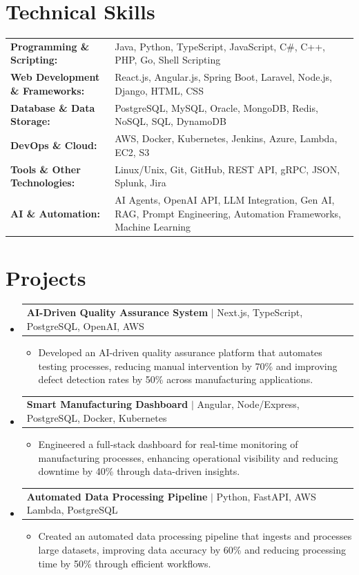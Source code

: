 \documentclass[letterpaper,10pt]{article}
\makeatletter
\newcommand{\resumeItem}[1]{
  \item{\fontsize{8pt}{9pt}\selectfont
    #1 \vspace{-3pt}
  }
}
\newcommand{\resumeProjectHeading}[2]{
    \item
    \begin{tabular*}{1.001\textwidth}{l@{\extracolsep{\fill}}r}
      \fontsize{8.5pt}{10pt}#1 & \textbf{\fontsize{8.5pt}{10pt} #2}\\
    \end{tabular*}\vspace{-7pt}
}
\newcommand{\resumeSubHeadingListStart}{\begin{itemize}[leftmargin=0pt, label={}]}
\newcommand{\resumeSubHeadingListEnd}{\end{itemize}}
\newcommand{\resumeItemListStart}{\begin{itemize}[leftmargin=*]}
\newcommand{\resumeItemListEnd}{\end{itemize}\vspace{-5pt}}
\makeatother
\begin{document}
\section{Technical Skills}
        \vspace{-14pt}
        \begin{table}[h]
            \fontsize{8pt}{9pt}\selectfont
            \begin{tabular}{p{0.3\linewidth} p{0.7\linewidth}}
                \textbf{Programming \& Scripting:} & Java, Python, TypeScript, JavaScript, C\#, C++, PHP, Go, Shell Scripting \\
                \textbf{Web Development \& Frameworks:} & React.js, Angular.js, Spring Boot, Laravel, Node.js, Django, HTML, CSS \\
                \textbf{Database \& Data Storage:} & PostgreSQL, MySQL, Oracle, MongoDB, Redis, NoSQL, SQL, DynamoDB \\
                \textbf{DevOps \& Cloud:} & AWS, Docker, Kubernetes, Jenkins, Azure, Lambda, EC2, S3 \\
                \textbf{Tools \& Other Technologies:} & Linux/Unix, Git, GitHub, REST API, gRPC, JSON, Splunk, Jira \\
                \textbf{AI \& Automation:} & AI Agents, OpenAI API, LLM Integration, Gen AI, RAG, Prompt Engineering, Automation Frameworks, Machine Learning \\
            \end{tabular}
        \end{table}
 \vspace{-18pt}

\section{Projects}
    \vspace{-5pt}
    \resumeSubHeadingListStart
          \resumeProjectHeading
            {\textbf{AI-Driven Quality Assurance System} $|$ Next.js, TypeScript, PostgreSQL, OpenAI, AWS}{}
            \resumeItemListStart
                \resumeItem{Developed an AI-driven quality assurance platform that automates testing processes, reducing manual intervention by 70\% and improving defect detection rates by 50\% across manufacturing applications.}
            \resumeItemListEnd
        \vspace{-12pt}
    
        \resumeProjectHeading
            {\textbf{Smart Manufacturing Dashboard} $|$ Angular, Node/Express, PostgreSQL, Docker, Kubernetes}{}
        \resumeItemListStart
                \resumeItem{Engineered a full-stack dashboard for real-time monitoring of manufacturing processes, enhancing operational visibility and reducing downtime by 40\% through data-driven insights.}
        \resumeItemListEnd
      \vspace{-12pt}
      \resumeProjectHeading
        {\textbf{Automated Data Processing Pipeline} $|$ Python, FastAPI, AWS Lambda, PostgreSQL}{}
    \resumeItemListStart
            \resumeItem{Created an automated data processing pipeline that ingests and processes large datasets, improving data accuracy by 60\% and reducing processing time by 50\% through efficient workflows.}
    \resumeItemListEnd
    \resumeSubHeadingListEnd
\end{document}
